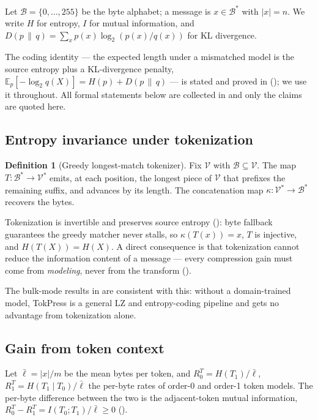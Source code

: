 \documentclass[10pt,twocolumn]{article}
\theoremstyle{plain}
\theoremstyle{definition}
\newtheorem{definition}[theorem]{Definition}
\newcommand{\B}{\mathcal{B}}
\newcommand{\V}{\mathcal{V}}
\newcommand{\KL}[2]{D\!\left(#1 \,\|\, #2\right)}
\begin{document}
Let $\B = \{0,\dots,255\}$ be the byte alphabet; a message is $x \in \B^*$ with
$|x| = n$. We write $H$ for entropy, $I$ for mutual information, and
$\KL{p}{q} = \sum_x p(x)\log_2 (p(x)/q(x))$ for KL divergence.

The coding identity --- the expected length under a mismatched model is the source
entropy plus a KL-divergence penalty, $\mathbb{E}_p[-\log_2 q(X)] = H(p)+\KL{p}{q}$ ---
is stated and proved in  (); we use it throughout.
All formal statements below are collected in  and only the claims
are quoted here.

\subsection{Entropy invariance under tokenization}

\begin{definition}[Greedy longest-match tokenizer]
Fix $\V$ with $\B \subseteq \V$. The map $T:\B^* \to \V^*$ emits, at each position,
the longest piece of $\V$ that prefixes the remaining suffix, and advances by its
length. The concatenation map $\kappa: \V^* \to \B^*$ recovers the bytes.
\end{definition}

Tokenization is invertible and preserves source entropy (): byte
fallback guarantees the greedy matcher never stalls, so $\kappa(T(x))=x$, $T$ is
injective, and $H(T(X)) = H(X)$. A direct consequence is that tokenization cannot
reduce the information content of a message --- every compression gain must come from
\emph{modeling}, never from the transform ().

The bulk-mode results in  are consistent with this: without a
domain-trained model, TokPress is a general LZ and entropy-coding pipeline and gets no
advantage from tokenization alone.

\subsection{Gain from token context}

Let $\bar\ell = |x|/m$ be the mean bytes per token, and $R_0^T = H(T_1)/\bar\ell$,
$R_1^T = H(T_1 \mid T_0)/\bar\ell$ the per-byte rates of order-0 and order-1 token
models. The per-byte difference between the two is the adjacent-token mutual
information, $R_0^T - R_1^T = I(T_0;T_1)/\bar\ell \ge 0$ ().
\end{document}
